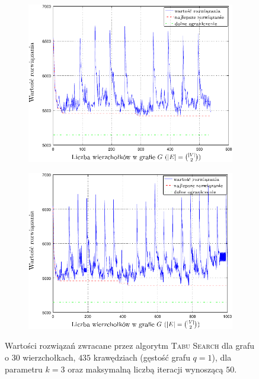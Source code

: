 \begin{figure}[!h]
	\null\hfill
	\begin{subfigure}[b]{0.45\textwidth}
		\includegraphics[width=\textwidth]{Chapter_VI/RRIMST8-example/RRIMST8_psfrag}
		\caption{}
		\label{fig:rrimst3:a}
	\end{subfigure}
	\hfill
	\begin{subfigure}[b]{0.45\textwidth}
		\includegraphics[width=\textwidth]{Chapter_VI/RRIMST9-example/RRIMST9_psfrag}
		\caption{}
		\label{fig:rrimst3:b}
	\end{subfigure}
	\hfill\null
	\caption{
		Wartości rozwiązań zwracane przez algorytm \textsc{Tabu Search} dla grafu o $30$ wierzchołkach, $435$ krawędziach (gęstość grafu $q = 1$), dla parametru $k = 3$ oraz maksymalną liczbą iteracji wynoszącą $50$.
}
\end{figure}
